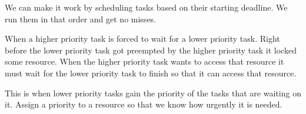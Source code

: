 \documentclass{article}
\begin{document}
We can make it work by scheduling tasks based on their starting deadline. We run them in that order and get no misses.






When a higher priority task is forced to wait for a lower priority task. Right before the lower priority task got preempted by the higher priority task it locked some resource. When the higher priority task wants to access that resource it must wait for the lower priority task to finish so that it can access that resource.


This is when lower priority tasks gain the priority of the tasks that are waiting on it. Assign a priority to a resource so that we know how urgently it is needed.
\end{document}
